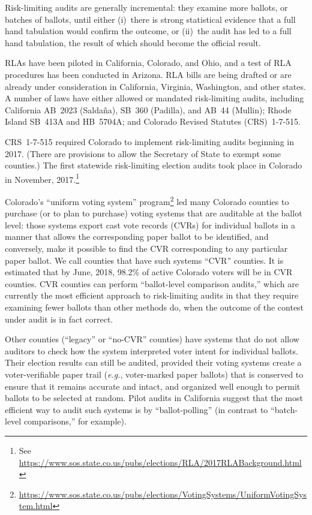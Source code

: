 \documentclass[12pt]{article}
\begin{document}
Risk-limiting audits are generally incremental: they examine more ballots, or batches of ballots,
until either (i)~there is strong statistical evidence that a full hand tabulation would confirm the outcome,
or (ii)~the audit has led to a full hand tabulation, the result of which should become the official
result.

RLAs have been piloted in California, Colorado, and Ohio, and a test of
RLA procedures has been conducted in Arizona.
RLA bills are being drafted or are already under consideration in California,
Virginia, Washington, and other states.
A number of laws have either allowed or mandated risk-limiting audits,
including California AB~2023 (Salda\~{n}a), SB~360 (Padilla), and AB~44 (Mullin);
Rhode Island SB~413A and HB~5704A; and Colorado Revised Statutes (CRS)~1-7-515.

CRS~1-7-515 required 
Colorado to implement risk-limiting audits beginning in 2017.
(There are provisions to allow the Secretary of State to exempt some counties.)
The first statewide risk-limiting election audits took place in Colorado in November, 2017.\footnote{%
 See \url{https://www.sos.state.co.us/pubs/elections/RLA/2017RLABackground.html}
}
 

Colorado's ``uniform voting system'' program\footnote{%
\url{https://www.sos.state.co.us/pubs/elections/VotingSystems/UniformVotingSystem.html}
} led
many Colorado counties to purchase (or to plan to purchase) voting systems
that are auditable at the ballot level: those systems export cast vote records (CVRs)
for individual ballots in a manner that allows the corresponding paper ballot to be identified,
and conversely, make it possible to find the CVR corresponding to any
particular paper ballot.
We call counties that have such systems ``CVR'' counties.
It is estimated that by June, 2018, 98.2\% of active Colorado voters will be in CVR counties.
CVR counties can perform ``ballot-level comparison audits,'' \citep{lindemanStark12} 
which are currently the
most efficient approach to risk-limiting audits in that they require examining
fewer ballots than other methods do, when the outcome of the contest under audit 
is in fact correct.

Other counties (``legacy'' or ``no-CVR'' counties) 
have systems that do not allow auditors to check how the system
interpreted voter intent for individual ballots.
Their election results can still be audited, provided their voting systems
create a voter-verifiable paper trail (\emph{e.g.}, voter-marked paper ballots) that is
conserved to ensure that it remains accurate and intact, and organized well enough
to permit ballots to be selected at random.
Pilot audits in California suggest that the most efficient way to audit such systems
is by ``ballot-polling'' \citep{lindemanEtal12,lindemanStark12} 
(in contrast to ``batch-level comparisons,'' for example).
\end{document}
